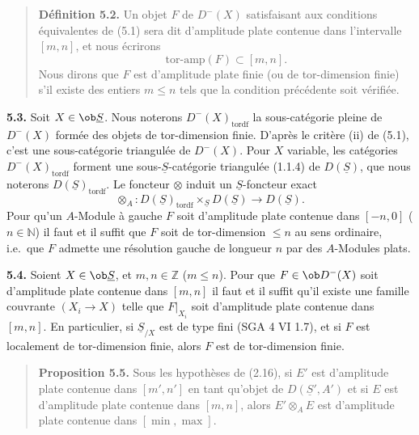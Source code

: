\begin{quote}
\textbf{Définition 5.2.} Un objet $F$ de $D^-(X)$ satisfaisant aux conditions équivalentes de (5.1) sera dit d'amplitude plate contenue dans l'intervalle $[m, n]$, et nous écrirons
\[
\text{tor-amp}(F) \subset [m, n].
\]
Nous dirons que $F$ est d'amplitude plate finie (ou de tor-dimension finie) s'il existe des entiers $m \leqslant n$ tels que la condition précédente soit vérifiée.
\end{quote}

\textbf{5.3.} Soit $X \in \ob \underline{S}$. Nous noterons $D^-(X)_{\mathrm{tordf}}$ la sous-catégorie pleine de $D^-(X)$ formée des objets de tor-dimension finie. D'après le critère (ii) de (5.1), c'est une sous-catégorie triangulée de $D^-(X)$. Pour $X$ variable, les catégories $D^-(X)_{\mathrm{tordf}}$ forment une sous-$\underline{S}$-catégorie triangulée (1.1.4) de $D(\underline{S})$, que nous noterons $D(\underline{S})_{\mathrm{tordf}}$. Le foncteur $\otimes$ induit un $\underline{S}$-foncteur exact
\[
\otimes_A : D(\underline{S})_{\mathrm{tordf}} \times_{\underline{S}} D(\underline{S}) \longrightarrow D(\underline{S}).
\]
Pour qu'un $A$-Module à gauche $F$ soit d'amplitude plate contenue dans $[-n, 0]$ ($n \in \mathbb{N}$) il faut et il suffit que $F$ soit de tor-dimension $\leqslant n$ au sens ordinaire, i.e.\ que $F$ admette une résolution gauche de longueur $n$ par des $A$-Modules plats.

\textbf{5.4.} Soient $X \in \ob \underline{S}$, et $m, n \in \mathbb{Z}$ ($m \leqslant n$). Pour que $F \in \ob D^-(X)$ soit d'amplitude plate contenue dans $[m, n]$ il faut et il suffit qu'il existe une famille couvrante $(X_i \to X)$ telle que $F|_{X_i}$ soit d'amplitude plate contenue dans $[m, n]$. En particulier, si $\underline{S}_{/X}$ est de type fini (SGA 4 VI 1.7), et si $F$ est localement de tor-dimension finie, alors $F$ est de tor-dimension finie.

\begin{quote}
\textbf{Proposition 5.5.} Sous les hypothèses de (2.16), si $E'$ est d'amplitude plate contenue dans $[m', n']$ en tant qu'objet de $D(\underline{S}', A')$ et si $E$ est d'amplitude plate contenue dans $[m, n]$, alors $E' \otimes_A E$ est d'amplitude plate contenue dans $[\min, \max]$.
\end{quote}

